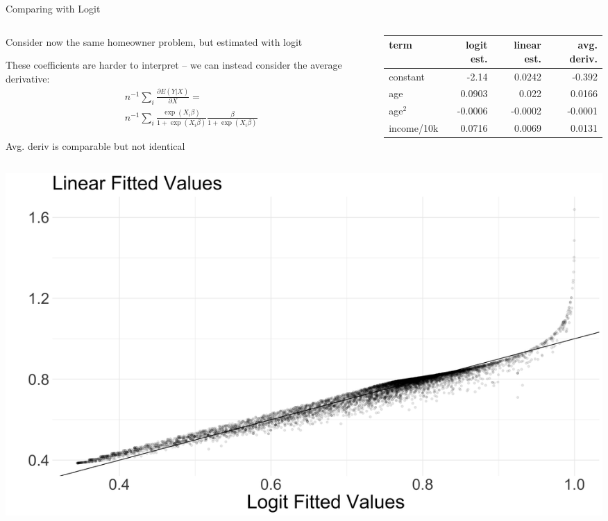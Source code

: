 \documentclass[notes,11pt, aspectratio=169]{beamer}
\newenvironment{wideitemize}{\itemize\addtolength{\itemsep}{10pt}}{\enditemize}
\begin{document}
\begin{frame}{Comparing with Logit}
  \begin{columns}[T] %
    \begin{column}{.35\textwidth}
      \begin{wideitemize}
      \item Consider now the same homeowner problem, but estimated with logit
      \item These coefficients are harder to interpret -- we can
        instead consider the average derivative:
        \begin{align*}
          &n^{-1}\sum_{i} \frac{\partial E(Y|X)}{\partial X} =\\
          &n^{-1}\sum_{i} \frac{\exp(X_{i}\beta)}{1+\exp(X_{i}\beta)}\frac{\beta}{1+\exp(X_{i}\beta)}
        \end{align*}
        \item Avg. deriv is comparable but not identical
      \end{wideitemize}
    \end{column}%
  \hfill%
  \begin{column}{.65\textwidth}
    \begin{center}
    \begin{tabular}{lrrr}
      term  &      logit est. & linear est. & avg. deriv. \\
      \midrule
      constant &      -2.14      &        0.0242 & -0.392 \\
      age      &         0.0903  &          0.022& 0.0166\\
      age$^{2}$ &          -0.0006&         -0.0002 & -0.0001\\
      income/10k     &       0.0716       &     0.0069 & 0.0131  
    \end{tabular}
  \end{center}
  \end{column}
\end{columns}
\end{frame}

\begin{frame}
  \begin{center}
    \includegraphics[width=0.8\linewidth]{images/linear_v_logit_scatter.png}
  \end{center}
\end{frame}
  
\end{document}
